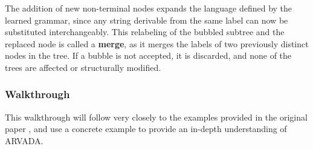 \vspace{\baselineskip}
The addition of new non-terminal nodes expands the language defined by the learned grammar, since any string derivable from the same label can now be substituted interchangeably. This relabeling of the bubbled subtree and the replaced node is called a \textbf{merge}, as it merges the labels of two previously distinct nodes in the tree. If a bubble is not accepted, it is discarded, and none of the trees are affected or structurally modified.

\subsubsection{Walkthrough}

This walkthrough will follow very closely to the examples provided in the original paper \cite{kulkarniLearningHighlyRecursive2021}, and use a concrete example to provide an in-depth understanding of ARVADA.

\vspace{\baselineskip}

